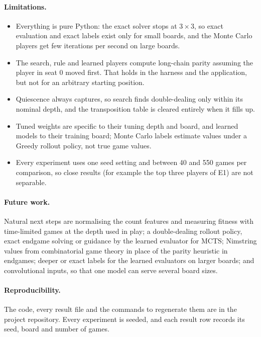 \documentclass[11pt,a4paper]{article}
\newcommand{\bd}[2]{$#1{\times}#2$}            %
\begin{document}
\paragraph{Limitations.}
\begin{itemize}
\item Everything is pure Python: the exact solver stops at \bd{3}{3}, so exact evaluation
  and exact labels exist only for small boards, and the Monte Carlo players get few
  iterations per second on large boards.
\item The search, rule and learned players compute long-chain parity assuming the player in
  seat 0 moved first. That holds in the harness and the application, but not for an
  arbitrary starting position.
\item Quiescence always captures, so search finds double-dealing only within its nominal
  depth, and the transposition table is cleared entirely when it fills up.
\item Tuned weights are specific to their tuning depth and board, and learned models to
  their training board; Monte Carlo labels estimate values under a Greedy rollout policy,
  not true game values.
\item Every experiment uses one seed setting and between 40 and 550 games per comparison, so
  close results (for example the top three players of E1) are not separable.
\end{itemize}

\paragraph{Future work.} Natural next steps are normalising the count features and measuring
fitness with time-limited games at the depth used in play; a double-dealing rollout policy,
exact endgame solving or guidance by the learned evaluator for MCTS; Nimstring values from
combinatorial game theory \cite{berlekamp2000dots} in place of the parity heuristic in
endgames; deeper or exact labels for the learned evaluators on larger boards; and
convolutional inputs, so that one model can serve several board sizes.

\paragraph{Reproducibility.} The code, every result file and the commands to regenerate
them are in the project repository. Every experiment is seeded, and each result row
records its seed, board and number of games.



\end{document}
